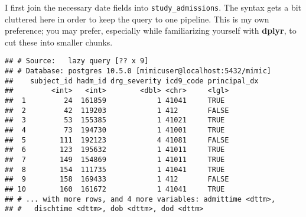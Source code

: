 \documentclass[]{article}
\newenvironment{Shaded}{\begin{snugshade}}{\end{snugshade}}
\newcommand{\KeywordTok}[1]{\textcolor[rgb]{0.13,0.29,0.53}{\textbf{#1}}}
\newcommand{\DataTypeTok}[1]{\textcolor[rgb]{0.13,0.29,0.53}{#1}}
\newcommand{\DecValTok}[1]{\textcolor[rgb]{0.00,0.00,0.81}{#1}}
\newcommand{\StringTok}[1]{\textcolor[rgb]{0.31,0.60,0.02}{#1}}
\newcommand{\OperatorTok}[1]{\textcolor[rgb]{0.81,0.36,0.00}{\textbf{#1}}}
\newcommand{\NormalTok}[1]{#1}
\begin{document}
I first join the necessary date fields into \texttt{study\_admissions}.
The syntax gets a bit cluttered here in order to keep the query to one
pipeline. This is my own preference; you may prefer, especially while
familiarizing yourself with \textbf{dplyr}, to cut these into smaller
chunks.

\begin{Shaded}
\end{Shaded}

\begin{verbatim}
## # Source:   lazy query [?? x 9]
## # Database: postgres 10.5.0 [mimicuser@localhost:5432/mimic]
##    subject_id hadm_id drg_severity icd9_code principal_dx
##         <int>   <int>        <dbl> <chr>     <lgl>       
##  1         24  161859            1 41041     TRUE        
##  2         42  119203            1 412       FALSE       
##  3         53  155385            1 41021     TRUE        
##  4         73  194730            1 41001     TRUE        
##  5        111  192123            4 41081     FALSE       
##  6        123  195632            1 41011     TRUE        
##  7        149  154869            1 41011     TRUE        
##  8        154  111735            1 41041     TRUE        
##  9        158  169433            1 412       FALSE       
## 10        160  161672            1 41041     TRUE        
## # ... with more rows, and 4 more variables: admittime <dttm>,
## #   dischtime <dttm>, dob <dttm>, dod <dttm>
\end{verbatim}
\end{document}
